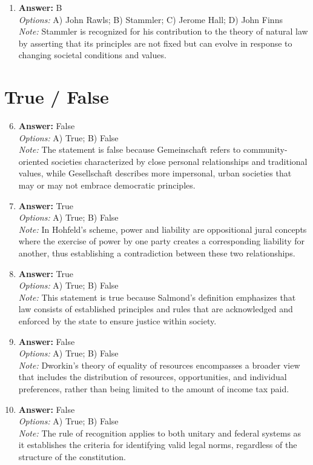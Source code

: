 \documentclass[12pt]{article}
\begin{document}
\begin{enumerate}[label=\arabic*.]
\\ \textit{Note:} Posner argues that law is heavily influenced by social and economic forces, suggesting that it cannot develop in isolation from these contextual factors, thereby denying its autonomy.
\item \textbf{Answer:} B
\\ \textit{Options:} A) John Rawls; B) Stammler; C) Jerome Hall; D) John Finns
\\ \textit{Note:} Stammler is recognized for his contribution to the theory of natural law by asserting that its principles are not fixed but can evolve in response to changing societal conditions and values.
\end{enumerate}

\section*{True / False}
\begin{enumerate}[label=\arabic*.]
\setcounter{enumi}{5}
\item \textbf{Answer:} False
\\ \textit{Options:} A) True; B) False
\\ \textit{Note:} The statement is false because Gemeinschaft refers to community-oriented societies characterized by close personal relationships and traditional values, while Gesellschaft describes more impersonal, urban societies that may or may not embrace democratic principles.
\item \textbf{Answer:} True
\\ \textit{Options:} A) True; B) False
\\ \textit{Note:} In Hohfeld's scheme, power and liability are oppositional jural concepts where the exercise of power by one party creates a corresponding liability for another, thus establishing a contradiction between these two relationships.
\item \textbf{Answer:} True
\\ \textit{Options:} A) True; B) False
\\ \textit{Note:} This statement is true because Salmond's definition emphasizes that law consists of established principles and rules that are acknowledged and enforced by the state to ensure justice within society.
\item \textbf{Answer:} False
\\ \textit{Options:} A) True; B) False
\\ \textit{Note:} Dworkin's theory of equality of resources encompasses a broader view that includes the distribution of resources, opportunities, and individual preferences, rather than being limited to the amount of income tax paid.
\item \textbf{Answer:} False
\\ \textit{Options:} A) True; B) False
\\ \textit{Note:} The rule of recognition applies to both unitary and federal systems as it establishes the criteria for identifying valid legal norms, regardless of the structure of the constitution.
\end{enumerate}
\end{document}
